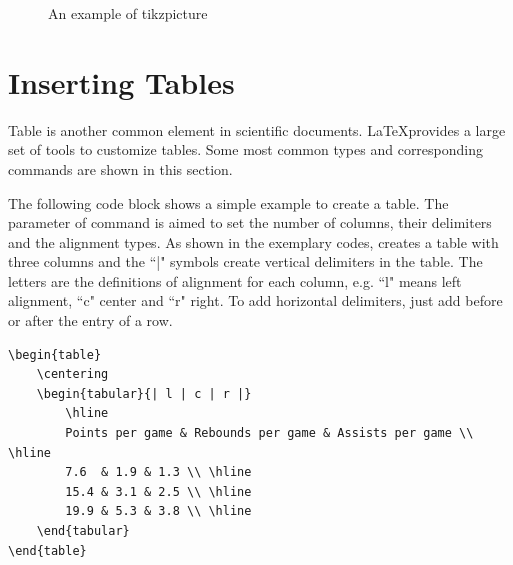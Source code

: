 	\begin{figure}[h!]
		\centering
		\caption{An example of tikzpicture}
		\label{tikzpic}
	\end{figure}
	
\section{Inserting Tables}

	Table is another common element in scientific documents. \LaTeX provides a large set of tools to customize tables. Some most common types and corresponding commands are shown in this section.
	
	The following code block shows a simple example to create a table. The parameter of command {\color{blue}{\verb|tabular|}} is aimed to set the number of columns, their delimiters and the alignment types. As shown in the exemplary codes, {} creates a table with three columns and the ``|" symbols create vertical delimiters in the table. The letters are the definitions of alignment for each column, e.g. ``l" means left alignment, ``c" center and ``r" right. To add horizontal delimiters, just add {\color{blue}{\verb|\hline|}} before or after the entry of a row. 
	
	\begin{minipage}{\linewidth}
		\begin{lstlisting}
\begin{table}
	\centering
	\begin{tabular}{| l | c | r |}
		\hline
		Points per game & Rebounds per game & Assists per game \\ \hline
		7.6  & 1.9 & 1.3 \\ \hline
		15.4 & 3.1 & 2.5 \\ \hline
		19.9 & 5.3 & 3.8 \\ \hline
	\end{tabular}
\end{table}
		\end{lstlisting}
	\end{minipage}

